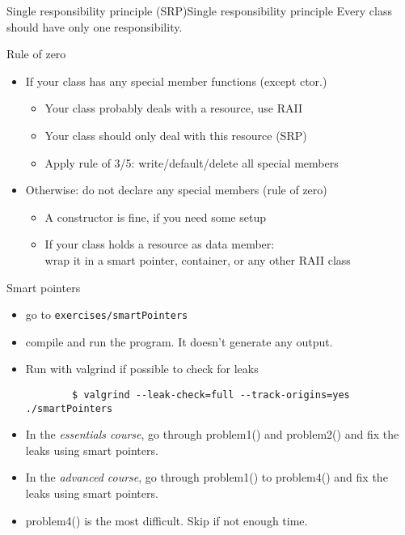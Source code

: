 \begin{frame}[fragile]
    \begin{goodpracticeWithShortcut}{Single responsibility principle (SRP)}{Single responsibility principle}
        Every class should have only one responsibility.
    \end{goodpracticeWithShortcut}
    \begin{goodpractice}{Rule of zero}
        \begin{itemize}
            \item If your class has any special member functions (except ctor.)
            \begin{itemize}
                \item Your class probably deals with a resource, use RAII
                \item Your class should only deal with this resource (SRP)
                \item Apply rule of 3/5: write/default/delete all special members
            \end{itemize}
            \item Otherwise: do not declare any special members (rule of zero)
            \begin{itemize}
                \item A constructor is fine, if you need some setup
                \item If your class holds a resource as data member:\\
                      wrap it in a smart pointer, container, or any other RAII class
            \end{itemize}
        \end{itemize}
    \end{goodpractice}
\end{frame}

\begin{frame}[fragile]
  \begin{exercise}{Smart pointers}
    \begin{itemize}
    \item go to \texttt{exercises/smartPointers}
    \item compile and run the program. It doesn't generate any output.
    \item Run with valgrind if possible to check for leaks
      { \scriptsize
      \begin{verbatim}
        $ valgrind --leak-check=full --track-origins=yes ./smartPointers
      \end{verbatim}
      }
    \item In the \emph{essentials course}, go through {\ttfamily problem1()} and {\ttfamily problem2()} and fix the leaks using smart pointers.
    \item In the \emph{advanced course}, go through {\ttfamily problem1()} to {\ttfamily problem4()} and fix the leaks using smart pointers.
    \item {\ttfamily problem4()} is the most difficult. Skip if not enough time.
    \end{itemize}
  \end{exercise}
\end{frame}
